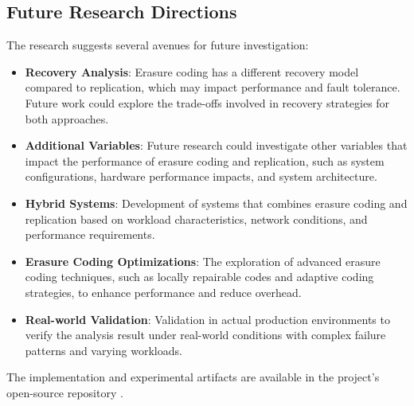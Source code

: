 \subsection{Future Research Directions}

The research suggests several avenues for future investigation:

\begin{itemize}
\item \textbf{Recovery Analysis}: Erasure coding has a different recovery model compared to replication, which may impact performance and fault tolerance. Future work could explore the trade-offs involved in recovery strategies for both approaches.
\item \textbf{Additional Variables}: Future research could investigate other variables that impact the performance of erasure coding and replication, such as system configurations, hardware performance impacts, and system architecture.
\item \textbf{Hybrid Systems}: Development of systems that combines erasure coding and replication based on workload characteristics, network conditions, and performance requirements.
\item \textbf{Erasure Coding Optimizations}: The exploration of advanced erasure coding techniques, such as locally repairable codes and adaptive coding strategies, to enhance performance and reduce overhead.
\item \textbf{Real-world Validation}: Validation in actual production environments to verify the analysis result under real-world conditions with complex failure patterns and varying workloads.
\end{itemize}

The implementation and experimental artifacts are available in the project's open-source repository \cite{ajiw2025distkv}.